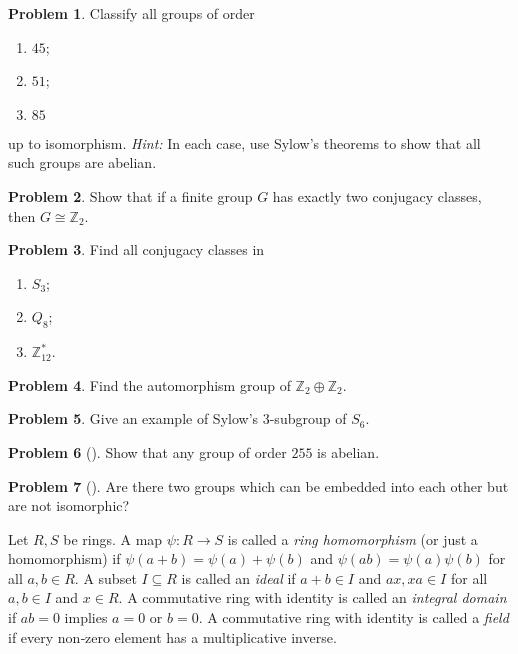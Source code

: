 \documentclass[10pt]{article}
\theoremstyle{definition} %
\newtheorem{problem}{Problem}
\theoremstyle{plain} %
\begin{document}
\begin{problem}
  Classify all groups of order
  \begin{enumerate}[label=(\alph*)]
      \item $45$;
      \item $51$;
      \item $85$
  \end{enumerate}
  up to isomorphism.  \textit{Hint:} In each case, use Sylow’s theorems to show that all such groups are abelian.
\end{problem}

\begin{problem}
  Show that if a finite group $G$ has exactly two conjugacy classes, then $G \cong \mathbb{Z}_2$.
\end{problem}

\begin{problem}
  Find all conjugacy classes in
  \begin{enumerate}[label=(\alph*)]
      \item $S_3$;
      \item $Q_8$;
      \item $\mathbb{Z}_{12}^{*}$.
  \end{enumerate}
\end{problem}

\begin{problem}
  Find the automorphism group of $\mathbb{Z}_2 \oplus \mathbb{Z}_2$.
\end{problem}

\begin{problem}
  Give an example of Sylow’s $3$-subgroup of $S_6$.
\end{problem}

\begin{problem}[]
  Show that any group of order $255$ is abelian.
\end{problem}

\begin{problem}[]
  Are there two groups which can be embedded into each other but are not isomorphic?
\end{problem}
Let $R, S$ be rings.  
A map $\psi : R \to S$ is called a \emph{ring homomorphism} (or just a homomorphism) if  
$\psi(a + b) = \psi(a) + \psi(b)$ and $\psi(ab) = \psi(a)\psi(b)$ for all $a, b \in R$.  
A subset $I \subseteq R$ is called an \emph{ideal} if $a + b \in I$ and $ax, xa \in I$ for all  
$a, b \in I$ and $x \in R$.  
A commutative ring with identity is called an \emph{integral domain} if $ab = 0$ implies  
$a = 0$ or $b = 0$.  
A commutative ring with identity is called a \emph{field} if every non‑zero element has a multiplicative inverse.
\end{document}
